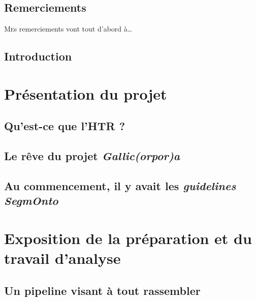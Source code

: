 \documentclass[a4paper,12pt,twoside]{book}
\begin{document}
	
	
	\chapter{Remerciements}
	\lettrine{M}es remerciements vont tout d'abord à\dots
	
	
	\chapter{Introduction}
	
	
	\thispagestyle{empty}
	\cleardoublepage
	
	\mainmatter
	
	\part{Présentation du projet}
	
	\chapter{Qu'est-ce que l'HTR ?}
	
	\label{chap:htr}

	\chapter{Le rêve du projet \textit{Gallic(orpor)a}}
	
	
	\chapter{Au commencement, il y avait les \textit{guidelines SegmOnto}}
	\label{chap:segmonto}
	
	
	\part{Exposition de la préparation et du travail d'analyse}

	\chapter{Un pipeline visant à tout rassembler}
	
	
\end{document}

